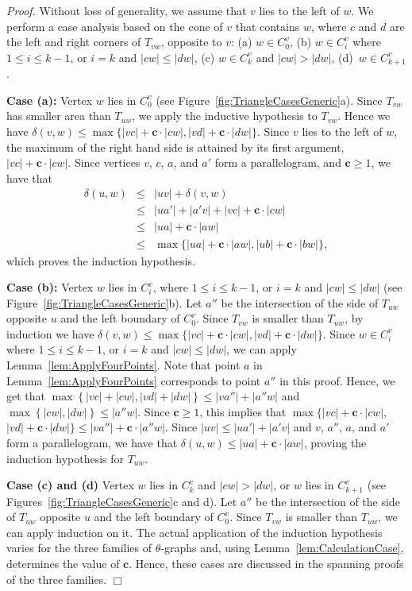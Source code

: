 \documentclass[12pt]{article}
\newenvironment{proof}{\emph{Proof.}}{\hfill $\Box$\\}
\newcommand{\canon}[2]{\ensuremath{T_{#1 #2}}}
\newcommand{\const}{\ensuremath{\boldsymbol{c}}\xspace}
\begin{document}
\begin{proof}
  Without loss of generality, we assume that $v$ lies to the left of $w$. We perform a case analysis based on the cone of $v$ that contains $w$, where $c$ and $d$ are the left and right corners of \canon{v}{w}, opposite to $v$: (a) $w \in C_0^v$, (b) $w \in C_i^v$ where $1 \leq i \leq k-1$, or $i = k$ and $|c w| \leq |d w|$, (c) $w \in C_k^v$ and $|c w| > |d w|$, \mbox{(d) $w \in C_{k+1}^v$}. 

  \textbf{Case (a):} Vertex $w$ lies in $C_0^v$ (see Figure~\ref{fig:TriangleCasesGeneric}a). Since \canon{v}{w} has smaller area than \canon{u}{w}, we apply the inductive hypothesis to \canon{v}{w}. Hence we have $\delta(v, w) \leq \max\{|v c| + \const \cdot |c w|, |v d| + \const \cdot |d w|\}$. Since $v$ lies to the left of $w$, the maximum of the right hand side is attained by its first argument, $|v c| + \const \cdot |c w|$. Since vertices $v$, $c$, $a$, and $a'$ form a parallelogram, and $\const \geq 1$, we have that
  \begin{eqnarray*}
    \delta(u, w) &\leq& |uv| + \delta(v, w) \\
		 &\leq& |u a'| + |a' v| + |v c| + \const \cdot |c w| \\
		 &\leq& |u a| + \const \cdot |a w| \\
		 &\leq& \max\{|u a| + \const \cdot |a w|, |u b| + \const \cdot |b w|\},
  \end{eqnarray*}
  which proves the induction hypothesis. 

  \textbf{Case (b):} Vertex $w$ lies in $C_i^v$, where $1 \leq i \leq k-1$, or $i = k$ and $|c w| \leq |d w|$ (see Figure~\ref{fig:TriangleCasesGeneric}b). Let $a''$ be the intersection of the side of $\canon{u}{w}$ opposite $u$ and the left boundary of $C_0^v$. Since $\canon{v}{w}$ is smaller than $\canon{u}{w}$, by induction we have $\delta(v, w) \leq \max\{|v c| + \const \cdot |c w|, |v d| + \const \cdot |d w|\}$. Since $w \in C_i^v$ where $1 \leq i \leq k-1$, or $i = k$ and $|c w| \leq |d w|$, we can apply Lemma~\ref{lem:ApplyFourPoints}. Note that point $a$ in Lemma~\ref{lem:ApplyFourPoints} corresponds to point $a''$ in this proof. Hence, we get that $\max\left\{|vc| + |cw|, |vd| + |dw|\right\} \leq |va''| + |a''w|$ and $\max\left\{|cw|, |dw|\right\} \leq |a''w|$. Since $\const \geq 1$, this implies that $\max \{ |vc| + \const \cdot |cw|,$ $|vd| + \const \cdot |dw| \} \leq |va''| + \const \cdot |a''w|$. Since $|u v| \leq |u a'| + |a' v|$ and $v$, $a''$, $a$, and $a'$ form a parallelogram, we have that $\delta(u, w) \leq |u a| + \const \cdot |a w|$, proving the induction hypothesis for \canon{u}{w}.

  \textbf{Case (c) and (d)} Vertex $w$ lies in $C_k^v$ and $|c w| > |d w|$, or $w$ lies in $C_{k+1}^v$ (see Figures~\ref{fig:TriangleCasesGeneric}c and d). Let $a''$ be the intersection of the side of $\canon{u}{w}$ opposite $u$ and the left boundary of $C_0^v$. Since \canon{v}{w} is smaller than \canon{u}{w}, we can apply induction on it. The actual application of the induction hypothesis varies for the three families of $\theta$-graphs and, using Lemma~\ref{lem:CalculationCase}, determines the value of \const. Hence, these cases are discussed in the spanning proofs of the three families. 
\end{proof}
\end{document}
